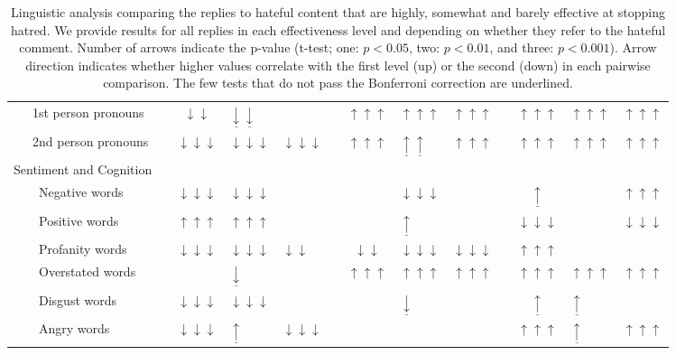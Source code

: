 \documentclass[11pt]{article}
\begin{document}
\begin{table*}
\begin{tabular}{l c
			cP{.375in}P{.375in} c
			cP{.375in}P{.375in} c
			cP{.375in}P{.375in}}
		~~~1st person pronouns && $\downarrow\downarrow$ & $\underline\downarrow\underline\downarrow$  & && $\uparrow\uparrow\uparrow$ & $\uparrow\uparrow\uparrow$ & $\uparrow\uparrow\uparrow$ && $\uparrow\uparrow\uparrow$ & $\uparrow\uparrow\uparrow$ & $\uparrow\uparrow\uparrow$ \\
		~~~2nd person pronouns && $\downarrow\downarrow\downarrow$ & $\downarrow\downarrow\downarrow$ & $\downarrow\downarrow\downarrow$ && $\uparrow\uparrow\uparrow$ & $\underline\uparrow\underline\uparrow$  & $\uparrow\uparrow\uparrow$ && $\uparrow\uparrow\uparrow$ & $\uparrow\uparrow\uparrow$ & $\uparrow\uparrow\uparrow$ \\ \midrule
		Sentiment and Cognition \\
		~~~~Negative words && $\downarrow\downarrow\downarrow$ & $\downarrow\downarrow\downarrow$ & && & $\downarrow\downarrow\downarrow$ & && $\underline\uparrow$  & & $\uparrow\uparrow\uparrow$  \\
		~~~~Positive words && $\uparrow\uparrow\uparrow$ & $\uparrow\uparrow\uparrow$ & & && $\underline\uparrow$  & && $\downarrow\downarrow\downarrow$ & & $\downarrow\downarrow\downarrow$ \\
		~~~~Profanity words && $\downarrow\downarrow\downarrow$ & $\downarrow\downarrow\downarrow$ & $\downarrow\downarrow$  && $\downarrow\downarrow$ & $\downarrow\downarrow\downarrow$ & $\downarrow\downarrow\downarrow$ && $\uparrow\uparrow\uparrow$ & & \\
		~~~~Overstated words && & $\underline\downarrow$  & && $\uparrow\uparrow\uparrow$ & $\uparrow\uparrow\uparrow$ & $\uparrow\uparrow\uparrow$ && $\uparrow\uparrow\uparrow$ & $\uparrow\uparrow\uparrow$ & $\uparrow\uparrow\uparrow$ \\
		~~~~Disgust words && $\downarrow\downarrow\downarrow$ & $\downarrow\downarrow\downarrow$ && & & $\underline\downarrow$  & && $\underline\uparrow$ & $\underline\uparrow$  & \\
		~~~~Angry words && $\downarrow\downarrow\downarrow$  & $\underline\uparrow$  & $\downarrow\downarrow\downarrow$ && & & && $\uparrow\uparrow\uparrow$ & $\underline\uparrow$ & $\uparrow\uparrow\uparrow$ \\ \bottomrule
	\end{tabular}
	
	\caption{Linguistic analysis comparing the replies to hateful content that are highly, somewhat and barely effective at stopping hatred.
		We provide results for all replies in each effectiveness level and depending on whether they refer to the hateful comment.
		Number of arrows indicate the p-value (t-test; one: $p<0.05$, two: $p<0.01$, and three: $p<0.001$).
		Arrow direction indicates whether higher values correlate with the first level (up) or the second (down) in each pairwise comparison. 
		The few tests that do not pass the Bonferroni correction are underlined.}
	\label{t:linguistic-analysis}
\end{table*}
\end{document}
